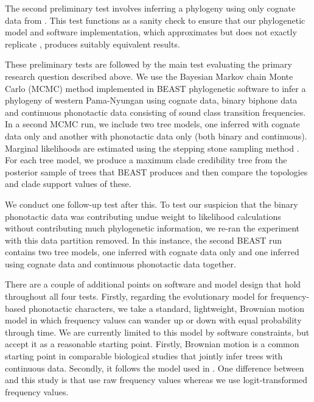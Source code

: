 \documentclass[]{article}
\begin{document}
The second preliminary test involves inferring a phylogeny using only cognate data from \textcite{bouckaert_origin_2018}. This test functions as a sanity check to ensure that our phylogenetic model and software implementation, which approximates but does not exactly replicate \textcite{bouckaert_origin_2018}, produces suitably equivalent results.

These preliminary tests are followed by the main test evaluating the primary research question described above. We use the Bayesian Markov chain Monte Carlo (MCMC) method implemented in BEAST phylogenetic software to infer a phylogeny of western Pama-Nyungan using cognate data, binary biphone data and continuous phonotactic data consisting of sound class transition frequencies. In a second MCMC run, we include two tree models, one inferred with cognate data only and another with phonotactic data only (both binary and continuous). Marginal likelihoods are estimated using the stepping stone sampling method \autocite{baele_accurate_2013}. For each tree model, we produce a maximum clade credibility tree from the posterior sample of trees that BEAST produces and then compare the topologies and clade support values of these.

We conduct one follow-up test after this. To test our suspicion that the binary phonotactic data was contributing undue weight to likelihood calculations without contributing much phylogenetic information, we re-ran the experiment with this data partition removed. In this instance, the second BEAST run contains two tree models, one inferred with cognate data only and one inferred using cognate data and continuous phonotactic data together.

There are a couple of additional points on software and model design that hold throughout all four tests. Firstly, regarding the evolutionary model for frequency-based phonotactic characters, we take a standard, lightweight, Brownian motion model in which frequency values can wander up or down with equal probability through time. We are currently limited to this model by software constraints, but accept it as a reasonable starting point. Firstly, Brownian motion is a common starting point in comparable biological studies that jointly infer trees with continuous data. Secondly, it follows the model used in \textcite{macklin-cordes_phylogenetic_2020}. One difference between \textcite{macklin-cordes_phylogenetic_2020} and this study is that \textcite{macklin-cordes_phylogenetic_2020} use raw frequency values whereas we use logit-transformed frequency values.
\end{document}
